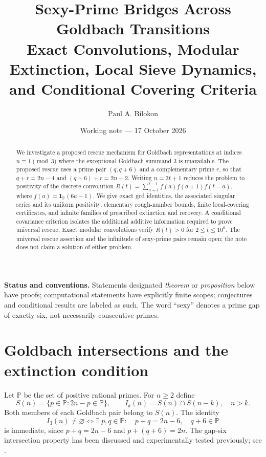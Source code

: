 \documentclass[11pt,a4paper]{article}
\title{\bfseries Sexy-Prime Bridges Across Goldbach Transitions\\[0.3em]
\large Exact Convolutions, Modular Extinction, Local Sieve Dynamics, and Conditional Covering Criteria}
\author{Paul A. Bilokon}
\date{Working note --- 17 October 2026}
\theoremstyle{definition}
\newcommand{\PP}{\mathbb P}
\newcommand{\one}{\mathbf 1}
\begin{document}
\maketitle
\begin{abstract}
We investigate a proposed rescue mechanism for Goldbach representations at indices
$n\equiv1\pmod3$ where the exceptional Goldbach summand $3$ is unavailable.
The proposed rescue uses a prime pair $(q,q+6)$ and a complementary prime $r$,
so that $q+r=2n-4$ and $(q+6)+r=2n+2$.  Writing $n=3t+1$ reduces the
problem to positivity of the discrete convolution
$R(t)=\sum_{a=1}^{t-1}f(a)f(a+1)f(t-a)$, where
$f(a)=\one_{\PP}(6a-1)$. We give exact gcd identities, the associated
singular series and its uniform positivity, elementary rough-number bounds,
finite local-covering certificates, and infinite families of prescribed
extinction and recovery. A conditional covariance criterion isolates the
additional additive information required to prove universal rescue.
Exact modular convolutions verify $R(t)>0$ for $2\le t\le10^6$.
The universal rescue assertion and the infinitude of sexy-prime pairs
remain open; the note does not claim a solution of either problem.
\end{abstract}

\noindent\textbf{Status and conventions.}
Statements designated \emph{theorem} or \emph{proposition} below have proofs;
computational statements have explicitly finite scopes; conjectures and
conditional results are labeled as such.  The word ``sexy'' denotes a
prime gap of exactly six, not necessarily consecutive primes.

\section{Goldbach intersections and the extinction condition}

Let $\PP$ be the set of positive rational primes. For $n\ge2$ define
\begin{equation}\label{eq:S}
 S(n)=\{p\in\PP:2n-p\in\PP\},\qquad
 I_k(n)=S(n)\cap S(n-k),\quad n>k.
\end{equation}
Both members of each Goldbach pair belong to $S(n)$.
The identity
\begin{equation}\label{eq:I3}
 I_3(n)\ne\varnothing
 \iff \exists\ p,q\in\PP:\quad p+q=2n-6,\quad q+6\in\PP
\end{equation}
is immediate, since $p+q=2n-6$ and $p+(q+6)=2n$.
The gap-six intersection property has been discussed and experimentally
tested previously; see \cite{GoldbachIntersectionMSE2014}.
\end{document}

